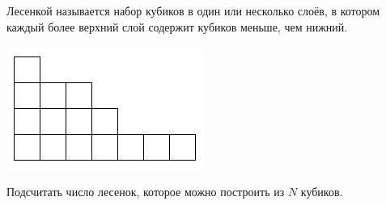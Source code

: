 Лесенкой называется набор кубиков в один или несколько слоёв, в котором
каждый более верхний слой содержит кубиков меньше, чем нижний.

\includegraphics[scale=1,natwidth=243, natheight=152]{lesenki_image_ru_1.jpg}

Подсчитать число лесенок, которое можно построить из $N$ кубиков.
